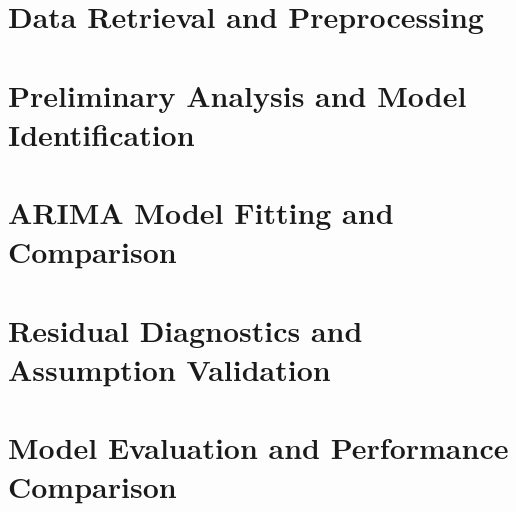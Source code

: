 \documentclass{article}
\begin{document}
\begin{cwauthorlist}
\end{cwauthorlist}

\section{Data Retrieval and Preprocessing}

\section{Preliminary Analysis and Model Identification}

\section{ARIMA Model Fitting and Comparison}

\section{Residual Diagnostics and Assumption Validation}

\section{Model Evaluation and Performance Comparison}
\end{document}
